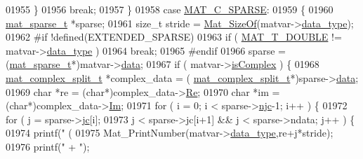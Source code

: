 \begin{DoxyCode}
{{{{{{{{{{{{{{{{{{{{{{{{{{{{{{{{{{{{{{{{{01955                 \}
01956                 \textcolor{keywordflow}{break};
01957             \}
01958             \textcolor{keywordflow}{case} \hyperlink{group___m_a_t_ggad4d60ae7b709fc81bfd744fb4c857c40a0d5655b7e6178a2242cb3bb56ff4c8d2}{MAT\_C\_SPARSE}:
01959             \{
01960                 \hyperlink{group___m_a_t_structmat__sparse__t}{mat\_sparse\_t} *sparse;
01961                 \textcolor{keywordtype}{size\_t} stride = \hyperlink{group__mat__util_gab6774aabdc124c540c1e7686d0804940}{Mat\_SizeOf}(matvar->\hyperlink{group___m_a_t_ab6aafe9bd77f0f077852593dec438144}{data\_type});
01962 \textcolor{preprocessor}{#if !defined(EXTENDED\_SPARSE)}
01963                 \textcolor{keywordflow}{if} ( \hyperlink{group___m_a_t_ggacf7b3b879282b7ab3a51190e49bf3453a31e721ecf7e188196f83c32838288797}{MAT\_T\_DOUBLE} != matvar->\hyperlink{group___m_a_t_ab6aafe9bd77f0f077852593dec438144}{data\_type} )
01964                     \textcolor{keywordflow}{break};
01965 \textcolor{preprocessor}{#endif}
01966                 sparse = (\hyperlink{group___m_a_t_structmat__sparse__t}{mat\_sparse\_t}*)matvar->\hyperlink{group___m_a_t_a5672978efa230bbdecdf38ede781f7fa}{data};
01967                 if ( matvar->\hyperlink{group___m_a_t_aeb03b3a69f108dc05470b00443a43739}{isComplex} ) \{
01968                     \hyperlink{group___m_a_t_structmat__complex__split__t}{mat\_complex\_split\_t} *complex\_data = (
      \hyperlink{group___m_a_t_structmat__complex__split__t}{mat\_complex\_split\_t}*)sparse->\hyperlink{group___m_a_t_ae2c648cb9eac4ce47f26cddb44246152}{data};
01969                     \textcolor{keywordtype}{char} *re = (\textcolor{keywordtype}{char}*)complex\_data->\hyperlink{group___m_a_t_a484a93607508adac2bce53a0252e0325}{Re};
01970                     \textcolor{keywordtype}{char} *im = (\textcolor{keywordtype}{char}*)complex\_data->\hyperlink{group___m_a_t_a7182d10b0d3598415887376065440946}{Im};
01971                     for ( i = 0; i < sparse->\hyperlink{group___m_a_t_a482d8e4b40aa975f0c1daf146ebe08a4}{njc}-1; i++ ) \{
01972                         \textcolor{keywordflow}{for} ( j = sparse->\hyperlink{group___m_a_t_ad1e74cdc4f7eff1e47a670297c01da4b}{jc}[i];
01973                               j < sparse->jc[i+1] && j < sparse->ndata; j++ ) \{
01974                             printf(\textcolor{stringliteral}{"    (%
01975                             Mat\_PrintNumber(matvar->\hyperlink{group___m_a_t_ab6aafe9bd77f0f077852593dec438144}{data\_type},re+j*stride);
01976                             printf(\textcolor{stringliteral}{" + "});
}}}}}}}}}}}}}}}}}}}}}}}}}}}}}}}}}}}}}}}}}}
\end{DoxyCode}

